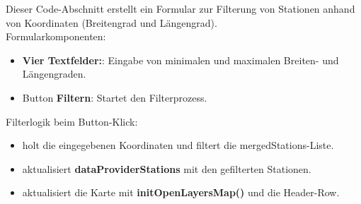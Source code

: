 \documentclass[a4paper,12pt]{scrreprt}
\begin{document}
Dieser Code-Abschnitt erstellt ein Formular zur Filterung von Stationen anhand von Koordinaten (Breitengrad und Längengrad).\\
Formularkomponenten:
\begin{itemize}
	\item \textbf{Vier Textfelder:}: Eingabe von minimalen und maximalen Breiten- und Längengraden.
	\item Button \textbf{Filtern}: Startet den Filterprozess.
\end{itemize}
Filterlogik beim Button-Klick:
\begin{itemize}
	\item holt die eingegebenen Koordinaten und filtert die mergedStations-Liste.
	\item aktualisiert \textbf{dataProviderStations} mit den gefilterten Stationen.
	\item aktualisiert die Karte mit \textbf{initOpenLayersMap()} und die Header-Row.
\end{itemize}
\end{document}
